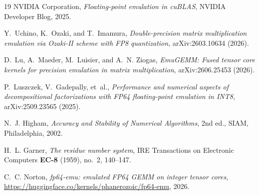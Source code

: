 \documentclass[11pt]{amsart}
\theoremstyle{plain}
\theoremstyle{definition}
\begin{document}
\begin{thebibliography}{19}
NVIDIA Corporation,
\emph{Floating-point emulation in cuBLAS},
NVIDIA Developer Blog, 2025.

Y.~Uchino, K.~Ozaki, and T.~Imamura,
\emph{Double-precision matrix multiplication emulation via Ozaki-II
scheme with FP8 quantization}, arXiv:2603.10634 (2026).

D.~Lu, A.~Maeder, M.~Luisier, and A.~N. Ziogas,
\emph{EmuGEMM: Fused tensor core kernels for precision emulation in
matrix multiplication}, arXiv:2606.25453 (2026).

P.~Luszczek, V.~Gadepally, et~al.,
\emph{Performance and numerical aspects of decompositional factorizations
with FP64 floating-point emulation in INT8}, arXiv:2509.23565 (2025).

N.~J. Higham,
\emph{Accuracy and Stability of Numerical Algorithms}, 2nd ed.,
SIAM, Philadelphia, 2002.

H.~L. Garner,
\emph{The residue number system},
IRE Transactions on Electronic Computers \textbf{EC-8} (1959), no.~2,
140--147.

C.~C. Norton,
\emph{fp64-emu: emulated FP64 GEMM on integer tensor cores},
\url{https://huggingface.co/kernels/phanerozoic/fp64-emu}, 2026.

\end{thebibliography}
\end{document}
